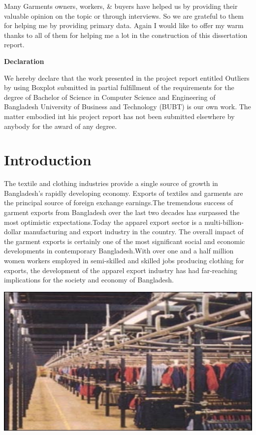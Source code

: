 \documentclass{article}
\begin{document}
Many Garments owners, workers, & buyers have helped us by providing their valuable opinion on the topic or through interviews. So we are grateful to them for helping me by providing primary data. Again I would like to offer my warm thanks to all of them for helping me a lot in the construction of this dissertation report.
\newpage
\begin{center}
    \huge \textbf{Declaration}
\end{center}
We hereby declare that the work presented in the project report entitled Outliers by using
Boxplot submitted in partial fulfillment of the requirements for the degree of Bachelor of Science
in Computer Science and Engineering of Bangladesh University of Business and Technology
(BUBT) is our own work.
The matter embodied int his project report has not been submitted elsewhere by anybody for
the award of any degree.
\newpage
\tableofcontents
\newpage
\section{Introduction}
The textile and clothing industries provide a single source of growth in Bangladesh's rapidly developing economy.
Exports of textiles and garments are the principal source of foreign exchange earnings.The tremendous success of garment exports from Bangladesh over the last two decades has surpassed the most optimistic expectations.Today the apparel export sector is a multi-billion-dollar manufacturing and  export industry in the country. The overall impact of the garment exports is certainly one of the most significant social and economic developments in contemporary Bangladesh.With over one and a half million women workers employed in semi-skilled and skilled jobs producing clothing for exports, the development of the apparel export industry has had far-reaching implications for the society and economy of Bangladesh.
\begin{center}
     \includegraphics[width=\textwidth]{img/img1.png}
\end{center}
\end{document}
